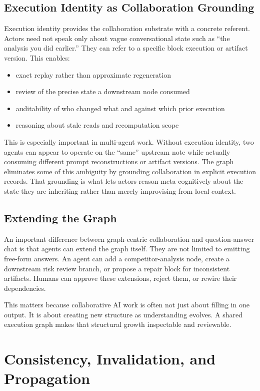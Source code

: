\documentclass{article}
\begin{document}
\subsection{Execution Identity as Collaboration Grounding}

Execution identity provides the collaboration substrate with a concrete referent. Actors need not speak only about vague conversational state such as ``the analysis you did earlier.'' They can refer to a specific block execution or artifact version. This enables:
\begin{itemize}
\item exact replay rather than approximate regeneration
\item review of the precise state a downstream node consumed
\item auditability of who changed what and against which prior execution
\item reasoning about stale reads and recomputation scope
\end{itemize}

This is especially important in multi-agent work. Without execution identity, two agents can appear to operate on the ``same'' upstream note while actually consuming different prompt reconstructions or artifact versions. The graph eliminates some of this ambiguity by grounding collaboration in explicit execution records. That grounding is what lets actors reason meta-cognitively about the state they are inheriting rather than merely improvising from local context.

\subsection{Extending the Graph}

An important difference between graph-centric collaboration and question-answer chat is that agents can extend the graph itself. They are not limited to emitting free-form answers. An agent can add a competitor-analysis node, create a downstream risk review branch, or propose a repair block for inconsistent artifacts. Humans can approve these extensions, reject them, or rewire their dependencies.

This matters because collaborative AI work is often not just about filling in one output. It is about creating new structure as understanding evolves. A shared execution graph makes that structural growth inspectable and reviewable.

\section{Consistency, Invalidation, and Propagation}
\end{document}
